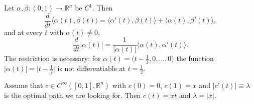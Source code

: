 \begin{lemma}
\label{lem:inner_product_derivative_identities}
Let $\alpha,\beta : (0,1) \to \mathbb{R}^n$ be $C^1$. Then
\[\frac{d}{dt}\langle\alpha(t),\beta(t)\rangle = \langle\alpha'(t),\beta(t)\rangle
  + \langle\alpha(t),\beta'(t)\rangle,\]
and at every $t$ with $\alpha(t) \neq 0$,
\[\frac{d}{dt}\lvert\alpha(t)\rvert = \frac{1}{\lvert\alpha(t)\rvert}\langle\alpha(t),\alpha'(t)\rangle.\]
The restriction is necessary: for $\alpha(t) = \big(t-\tfrac12,0,\dots,0\big)$ the function
$\lvert\alpha(t)\rvert = \lvert t-\tfrac12\rvert$ is not differentiable at $t=\tfrac12$.
\end{lemma}

\begin{proposition}
\label{prop:geodesic_straight_line}
Assume that $c \in C^\infty([0,1],\mathbb{R}^n)$ with $c(0)=0$, $c(1)=x$ and
$\lvert c'(t)\rvert \equiv \lambda$ is the optimal path we are looking for. Then $c(t) = xt$
and $\lambda = \lvert x\rvert$.
\end{proposition}

